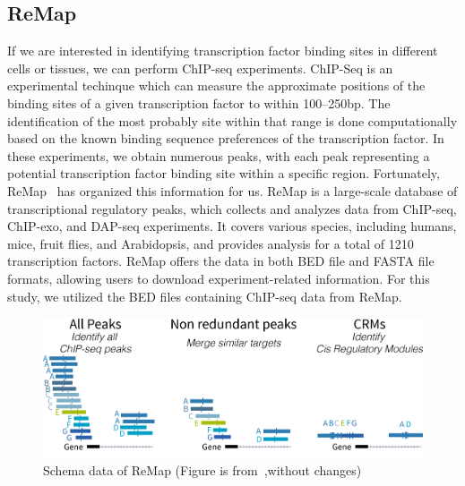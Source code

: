 \documentclass{PHlab-thesis}
\begin{document}
\subsection{ReMap}
If we are interested in identifying transcription factor binding sites in different cells or tissues, we can perform ChIP-seq experiments. ChIP-Seq is an experimental techinque which can measure the approximate positions of the binding sites of a given transcription factor to within 100–250bp. The identification of the most probably site within that range is done computationally based on the known binding sequence preferences of the transcription factor. In these experiments, we obtain numerous peaks, with each peak representing a potential transcription factor binding site within a specific region. Fortunately, ReMap~\cite{ReMapFayrouz2022} has organized this information for us. ReMap is a large-scale database of transcriptional regulatory peaks, which collects and analyzes data from ChIP-seq, ChIP-exo, and DAP-seq experiments. It covers various species, including humans, mice, fruit flies, and Arabidopsis, and provides analysis for a total of 1210 transcription factors. ReMap offers the data in both BED file and FASTA file formats, allowing users to download experiment-related information. For this study, we utilized the BED files containing ChIP-seq data from ReMap.

\begin{figure}[H]
	\centering
	\includegraphics[scale=0.5]{figures/schema_data_remap2020_2.png}
	\caption{Schema data of ReMap (Figure is from~\cite{ReMapFayrouz2022},without changes)}
	\label{fig:remap} %
\end{figure}
\end{document}
